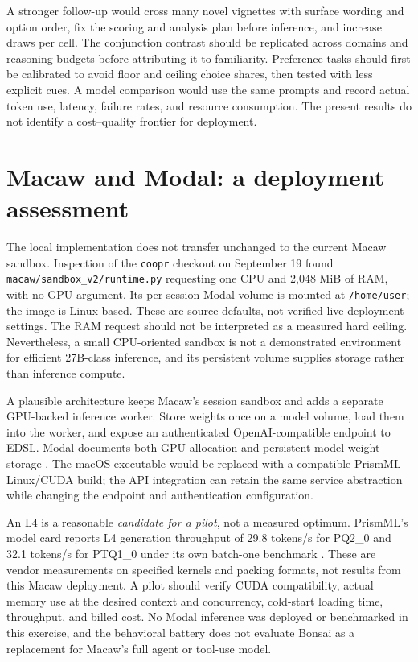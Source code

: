 \documentclass[11pt,letterpaper]{article}
\begin{document}
A stronger follow-up would cross many novel vignettes with surface wording and
option order, fix the scoring and analysis plan before inference, and increase
draws per cell. The conjunction contrast should be replicated across domains
and reasoning budgets before attributing it to familiarity. Preference tasks
should first be calibrated to avoid floor and ceiling choice shares, then
tested with less explicit cues. A model comparison would use the same prompts
and record actual token use, latency, failure rates, and resource consumption.
The present results do not identify a cost--quality frontier for deployment.

\section{Macaw and Modal: a deployment assessment}
The local implementation does not transfer unchanged to the current Macaw
sandbox. Inspection of the \texttt{coopr} checkout on September 19 found
\texttt{macaw/sandbox\_v2/runtime.py} requesting one CPU and 2,048 MiB of RAM,
with no GPU argument. Its per-session Modal volume is mounted at
\texttt{/home/user}; the image is Linux-based. These are source defaults,
not verified live deployment settings. The RAM request should not be interpreted
as a measured hard ceiling. Nevertheless, a small CPU-oriented sandbox is not
a demonstrated environment for efficient 27B-class inference, and its persistent
volume supplies storage rather than inference compute.

A plausible architecture keeps Macaw's session sandbox and adds a separate
GPU-backed inference worker. Store weights once on a model volume, load them
into the worker, and expose an authenticated OpenAI-compatible endpoint to
EDSL. Modal documents both GPU allocation and persistent model-weight storage
\citep{modalgpu,modalweights}. The macOS executable would be replaced with a
compatible PrismML Linux/CUDA build; the API integration can retain the same
service abstraction while changing the endpoint and authentication configuration.

An L4 is a reasonable \emph{candidate for a pilot}, not a measured optimum.
PrismML's model card reports L4 generation throughput of 29.8 tokens/s for
PQ2\_0 and 32.1 tokens/s for PTQ1\_0 under its own batch-one benchmark
\citep{prismmodel}. These are vendor measurements on specified kernels and
packing formats, not results from this Macaw deployment. A pilot should verify
CUDA compatibility, actual memory use at the desired context and concurrency,
cold-start loading time, throughput, and billed cost. No Modal inference was
deployed or benchmarked in this exercise, and the behavioral battery does not
evaluate Bonsai as a replacement for Macaw's full agent or tool-use model.
\end{document}
